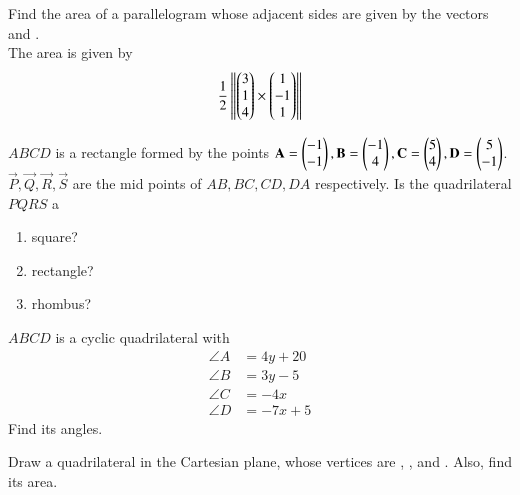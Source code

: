 \item Find the area of a parallelogram whose adjacent sides are given by the vectors  and .
%
\\
\solution  The area is given by 
%
\begin{align}
\frac{1}{2}\norm{\myvec{3\\1\\4} \times \myvec{1\\-1\\1}}
\end{align}
%
\item $ABCD$ is a rectangle formed by the points $\vec{A} = \myvec{-1\\-1}, \vec{B} = \myvec{-1\\4}, \vec{C} = \myvec{5\\4}, \vec{D} = \myvec{5\\-1}$. $ \vec{P}, \vec{Q}, \vec{R}, \vec{S}$ are the mid points of $AB, BC, CD, DA$ respectively.  Is the quadrilateral $PQRS$ a 
\begin{enumerate}
\item square?
\item rectangle?
\item rhombus?
\end{enumerate}
\solution

\item $ABCD$ is a cyclic quadrilateral with 
\begin{align}
\angle A &= 4y+20
\\
\angle B &= 3y-5
\\
\angle C &= -4x
\\
\angle D &= -7x+5
\end{align}
%
Find its angles.
\\
\solution

\item Draw a quadrilateral in the Cartesian plane, whose vertices are , ,  and . Also, find its area.
\\
\solution


